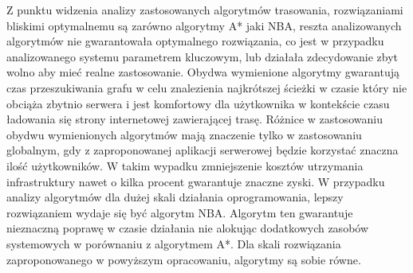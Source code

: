Z punktu widzenia analizy zastosowanych algorytmów trasowania, rozwiązaniami bliskimi optymalnemu są zarówno algorytmy A* jaki NBA, reszta analizowanych algorytmów nie gwarantowała optymalnego rozwiązania, co jest w przypadku analizowanego systemu parametrem kluczowym, lub działała zdecydowanie zbyt wolno aby mieć realne zastosowanie. Obydwa wymienione algorytmy gwarantują czas przeszukiwania grafu w celu znalezienia najkrótszej ścieżki w czasie który nie obciąża zbytnio serwera i jest komfortowy dla użytkownika w kontekście czasu ładowania się strony internetowej zawierającej trasę. Różnice w zastosowaniu obydwu wymienionych algorytmów mają znaczenie tylko w zastosowaniu globalnym, gdy z zaproponowanej aplikacji serwerowej będzie korzystać znaczna ilość użytkowników. W takim wypadku zmniejszenie kosztów utrzymania infrastruktury nawet o kilka procent gwarantuje znaczne zyski. W przypadku analizy algorytmów dla dużej skali działania oprogramowania, lepszy rozwiązaniem wydaje się być algorytm NBA. Algorytm ten gwarantuje nieznaczną poprawę w czasie działania nie alokując dodatkowych zasobów systemowych w porównaniu z algorytmem A*. Dla skali rozwiązania zaproponowanego w powyższym opracowaniu, algorytmy są sobie równe.
